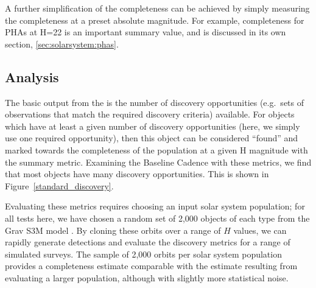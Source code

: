 A further simplification of the completeness can be achieved by simply
measuring the completeness at a preset absolute magnitude. For
example, completeness for PHAs at H=22 is an important summary value,
and is discussed in its own section, \ref{sec:solarsystem:phas}.



\subsection{\OpSim Analysis}
\label{sec:\secname:analysis}

The basic output from the  is the number
of discovery opportunities (e.g.\ sets of observations that match the
required discovery criteria) available. For objects which have at
least a given number of discovery opportunities (here, we simply use
one required opportunity), then this object can be considered
``found'' and marked towards the completeness of the population at a
given H magnitude with the  summary metric.
Examining the  Baseline Cadence with these metrics,
we find that most objects have many discovery opportunities. This is shown in
Figure~\ref{standard_discovery}.

Evaluating these metrics requires choosing an input solar system population;
for all tests here, we have chosen a random set of 2,000 objects of each type from
the Grav S3M model \citep{2011PASP..123..423G}. By cloning these orbits over a
range of $H$ values, we can rapidly generate detections and evaluate the discovery
metrics for a range of simulated surveys. The sample of 2,000 orbits per solar system
population provides a completeness estimate comparable with the estimate
resulting from evaluating a larger population, although with slightly more
statistical noise.

